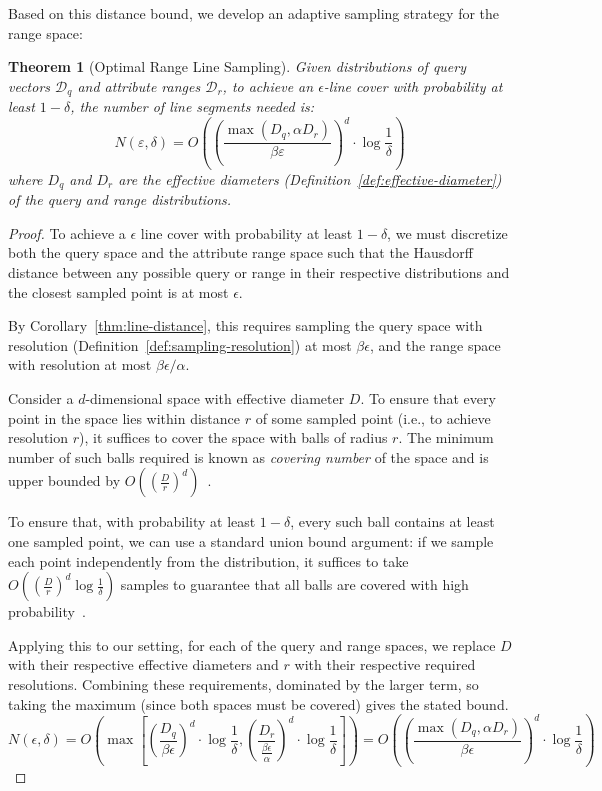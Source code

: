 \documentclass[numbers,sort]{article}
\newtheorem{theorem}{Theorem}
\begin{document}
Based on this distance bound, we develop an adaptive sampling strategy for the range space:

\begin{theorem}[Optimal Range Line Sampling]
\label{thm:optimal-sampling}
Given distributions of query vectors $\mathcal{D}_q$ and attribute ranges $\mathcal{D}_r$, to achieve an $\epsilon$-line cover with probability at least $1-\delta$, the number of line segments needed is:
\begin{equation}
N(\varepsilon, \delta) = O\left(\left(\frac{\max(D_q, \alpha D_r)}{\beta\varepsilon}\right)^d \cdot \log\frac{1}{\delta}\right)
\end{equation}
where $D_q$ and $D_r$ are the effective diameters (Definition~\ref{def:effective-diameter}) of the query and range distributions.
\end{theorem}

\begin{proof}
To achieve a $\epsilon$ line cover with probability at least $1-\delta$, we must discretize both the query space and the attribute range space such that the Hausdorff distance between any possible query or range in their respective distributions and the closest sampled point is at most $\epsilon$. 

By Corollary~\ref{thm:line-distance}, this requires sampling the query space with resolution (Definition~\ref{def:sampling-resolution}) at most $\beta\epsilon$, and the range space with resolution at most $\beta\epsilon/\alpha$.

Consider a $d$-dimensional space with effective diameter $D$. To ensure that every point in the space lies within distance $r$ of some sampled point (i.e., to achieve resolution $r$), it suffices to cover the space with balls of radius $r$. The minimum number of such balls required is known as \emph{covering number} of the space and is upper bounded by $O\left(\left(\frac{D}{r}\right)^d\right)$~\cite{vershynin2018high}.

To ensure that, with probability at least $1-\delta$, every such ball contains at least one sampled point, we can use a standard union bound argument: if we sample each point independently from the distribution, it suffices to take $O\left(\left(\frac{D}{r}\right)^d \log\frac{1}{\delta}\right)$ samples to guarantee that all balls are covered with high probability~\cite{matousek2002lectures}.

Applying this to our setting, for each of the query and range spaces, we replace $D$ with their respective effective diameters and $r$ with their respective required resolutions. Combining these requirements, dominated by the larger term, so taking the maximum (since both spaces must be covered) gives the stated bound.
\[
N(\epsilon, \delta) = O\left(\max\left[\left(\frac{D_q}{\beta\epsilon}\right)^d \cdot \log\frac{1}{\delta},\left(\frac{D_r}{\frac{\beta\epsilon}{\alpha}}\right)^d \cdot \log\frac{1}{\delta}\right]\right)=O\left(\left(\frac{\max(D_q, \alpha D_r)}{\beta\epsilon}\right)^d \cdot \log\frac{1}{\delta}\right)
\]
\end{proof}
\end{document}
